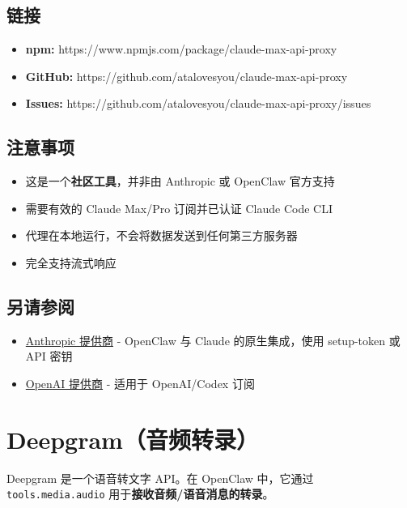 \subsection{链接}


\begin{itemize}
  \item \textbf{npm:} https://www.npmjs.com/package/claude-max-api-proxy
  \item \textbf{GitHub:} https://github.com/atalovesyou/claude-max-api-proxy
  \item \textbf{Issues:} https://github.com/atalovesyou/claude-max-api-proxy/issues
\end{itemize}


\subsection{注意事项}


\begin{itemize}
  \item 这是一个\textbf{社区工具}，并非由 Anthropic 或 OpenClaw 官方支持
  \item 需要有效的 Claude Max/Pro 订阅并已认证 Claude Code CLI
  \item 代理在本地运行，不会将数据发送到任何第三方服务器
  \item 完全支持流式响应
\end{itemize}


\subsection{另请参阅}


\begin{itemize}
  \item \href{/providers/anthropic}{Anthropic 提供商} - OpenClaw 与 Claude 的原生集成，使用 setup-token 或 API 密钥
  \item \href{/providers/openai}{OpenAI 提供商} - 适用于 OpenAI/Codex 订阅
\end{itemize}



\clearpage

\section{Deepgram（音频转录）}


Deepgram 是一个语音转文字 API。在 OpenClaw 中，它通过 \texttt{tools.media.audio} 用于\textbf{接收音频/语音消息的转录}。


